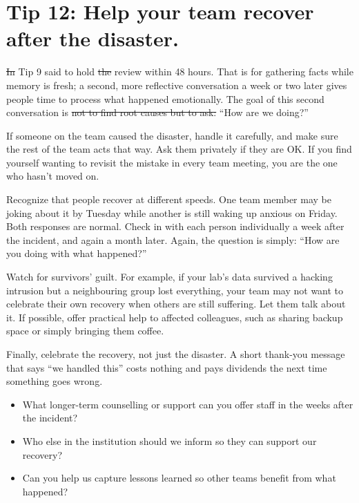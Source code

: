 \documentclass[10pt,letterpaper]{article}
\providecommand{\DIFadd}[1]{{\protect\color{blue}\uwave{#1}}} %
\providecommand{\DIFdel}[1]{{\protect\color{red}\sout{#1}}} %
\providecommand{\DIFaddbegin}{} %
\providecommand{\DIFaddend}{} %
\providecommand{\DIFdelbegin}{} %
\providecommand{\DIFdelend}{} %
\begin{document}
\section*{Tip 12: Help your team recover after the disaster.}

\DIFdelbegin \DIFdel{In }\DIFdelend Tip 9 said to hold \DIFdelbegin \DIFdel{the }\DIFdelend \DIFaddbegin \DIFadd{a short }\DIFaddend review within 48 hours. That is for gathering facts
while memory is fresh; a second, more reflective conversation a week or two
later gives people time to process what happened emotionally.  The goal of this
second conversation is \DIFdelbegin \DIFdel{not to find root causes but to ask: }\DIFdelend \DIFaddbegin \DIFadd{to ask, }\DIFaddend ``How are we doing?''

If someone on the team caused the disaster, handle it carefully, and make sure
the rest of the team acts that way.  Ask them privately if they are OK.  If you
find yourself wanting to revisit the mistake in every team meeting, you are the
one who hasn't moved on.

Recognize that people recover at different speeds.  One team member may be
joking about it by Tuesday while another is still waking up anxious on Friday.
Both responses are normal.  Check in with each person individually a week after
the incident, and again a month later.  Again, the question is simply: ``How are
you doing with what happened?''

Watch for survivors' guilt.  For example, if your lab's data survived a hacking
intrusion but a neighbouring group lost everything, your team may not want to
celebrate their own recovery when others are still suffering.  Let them talk
about it. If possible, offer practical help to affected colleagues, such as
sharing backup space or simply bringing them coffee.

Finally, celebrate the recovery, not just the disaster. A short thank-you
message that says ``we handled this'' costs nothing and pays dividends the next
time something goes wrong.

\begin{notebox}
  \begin{itemize}
  \item What longer-term counselling or support can you offer staff in the weeks
    after the incident?
  \item Who else in the institution should we inform so they can support our
    recovery?
  \item Can you help us capture lessons learned so other teams benefit from what
    happened?
  \end{itemize}
\end{notebox}

\nocite{*}

\end{document}
